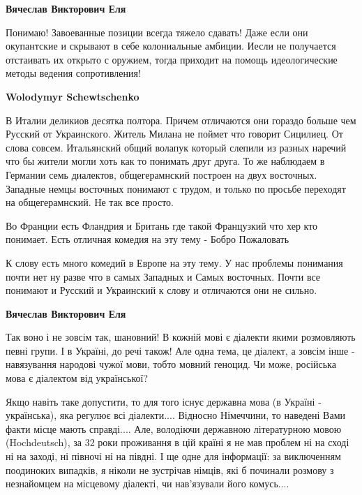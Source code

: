 \begin{itemize}
\begin{itemize}
\textbf{Вячеслав Викторович Еля} 

Понимаю! Завоеванные позиции всегда тяжело сдавать! Даже если они окупантские и
скрывают в себе колониальные амбиции. Иесли не получается отстаивать их открыто
с оружием, тогда приходит на помощь идеологические методы ведения
сопротивления!


\textbf{Wolodymyr Schewtschenko} 

В Италии деликиов десятка полтора. Причем отличаются они гораздо больше чем
Русский от Украинского. Житель Милана не поймет что говорит Сицилиец. От слова
совсем. Итальянский общий волапук который слепили из разных наречий что бы
жители могли хоть как то понимать друг друга. То же наблюдаем в Германии семь
диалектов, общегерамнский построен на двух восточных. Западные немцы восточных
понимают с трудом, и только по просьбе переходят на общегерамнский. Не так все
просто.


Во Франции есть Фландрия и Британь где такой Французкий что хер кто понимает.
Есть отличная комедия на эту тему - Бобро Пожаловать


К слову есть много комедий в Европе на эту тему. У нас проблемы понимания почти
нет ну разве что в самых Западных и Самых восточных. Почти все понимают и
Русский и Украинский к слову и отличаются они не сильно.


\textbf{Вячеслав Викторович Еля} 

Так воно і не зовсім так, шановний! В кожній мові є діалекти якими розмовляють
певні групи. І в Україні, до речі також! Але одна тема, це діалект, а зовсім
інше - навязування народові чужої мови, тобто мовний геноцид. Чи може,
російська мова є діалектом від української? 

Якщо навіть таке допустити, то для того існує державна мова (в Україні -
українська), яка регулює всі діалекти.... Відносно Німеччини, то наведені Вами
факти місце мають справді.... Але, володіючи державною літературною мовою
(Hochdeutsch), за 32 роки проживання в цій країні я не мав проблем ні на сході
ні на заході, ні півночі ні на півдні. І ще одне для інформації: за виключенням
поодиноких випадків, я ніколи не зустрічав німців, які б починали розмову з
незнайомцем на місцевому діалекті, чи нав'язували його комусь....


\end{itemize}
\end{itemize}
